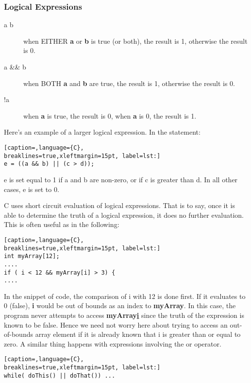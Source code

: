 \subsubsection{Logical Expressions}
\begin{description}
	\item[a \textbar{}\textbar{} b] when EITHER \textbf{a} or \textbf{b} is true (or both), the result is 1, otherwise the result is 0.
	\item[a \&\& b] when BOTH \textbf{a} and \textbf{b} are true, the result is 1, otherwise the result is 0.
	\item[!a] when \textbf{a} is true, the result is 0, when \textbf{a} is 0, the result is 1.
\end{description}

Here's an example of a larger logical expression. In the statement:
\lstset{basicstyle=\scriptsize, numbers=left, captionpos=b, tabsize=4}
\begin{lstlisting}[caption=,language={C},
breaklines=true,xleftmargin=15pt, label=lst:]
e = ((a && b) || (c > d));
\end{lstlisting}
e is set equal to 1 if a and b are non-zero, or if c is greater than d. In all
other cases, e is set to 0.

C uses short circuit evaluation of logical expressions. That is to say, once it
is able to determine the truth of a logical expression, it does no further
evaluation. This is often useful as in the following:
\lstset{basicstyle=\scriptsize, numbers=left, captionpos=b, tabsize=4}
\begin{lstlisting}[caption=,language={C},
breaklines=true,xleftmargin=15pt, label=lst:]
int myArray[12];
....
if ( i < 12 && myArray[i] > 3) { 
....
\end{lstlisting}

In the snippet of code, the comparison of i with 12 is done first. If it
evaluates to 0 (false), \textbf{i} would be out of bounds as an index to
\textbf{myArray}. In this case, the program never attempts to access
\textbf{myArray\url{i}} since the truth of the expression is known to be false.
Hence we need not worry here about trying to access an out-of-bounds array
element if it is already known that i is greater than or equal to zero.
A similar thing happens with expressions involving the or \textbar{}\textbar{}
operator.
\lstset{basicstyle=\scriptsize, numbers=left, captionpos=b, tabsize=4}
\begin{lstlisting}[caption=,language={C},
breaklines=true,xleftmargin=15pt, label=lst:]
while( doThis() || doThat()) ...
\end{lstlisting}

